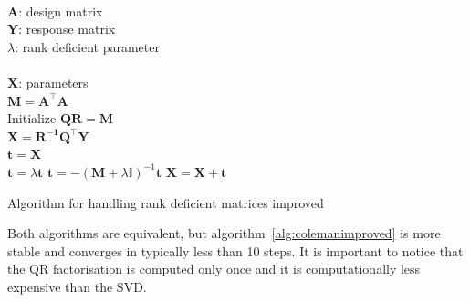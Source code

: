 \begin{algorithm}[H]
\begin{algorithmic}[1]
\REQUIRE $\,$ \\
$\mathbf{A}$: design matrix \\
$\mathbf{Y}$: response matrix \\
$\lambda$: rank deficient parameter \\
\ENSURE  $\,$ \\
$\mathbf{X}$: parameters \\
\STATE $\mathbf{M}=\mathbf{A^\top A}$ \\
\STATE Initialize $\mathbf{Q R}=\mathbf{M}$ \\
\STATE $\mathbf{X} = \mathbf{R^{-1}Q^\top Y}$ \\
\STATE $\mathbf{t} = \mathbf{X}$ \\
        \STATE $\mathbf{t} =\lambda \mathbf{t}$  
        \STATE $\mathbf{t} =  -(\mathbf{M}+\lambda\mathbb{I})^{-1}\mathbf{t}$
	\STATE $\mathbf{X}=\mathbf{X} + \mathbf{t}$
\ENDFOR
\end{algorithmic}
\caption{Algorithm for handling rank deficient matrices improved}
\label{alg:colemanimproved}
\end{algorithm}

Both algorithms are equivalent, but algorithm~\ref{alg:colemanimproved} is more
stable and converges in typically less than 10 steps.
It is important to notice that the QR factorisation is computed only once and it
is computationally less expensive than the SVD.


